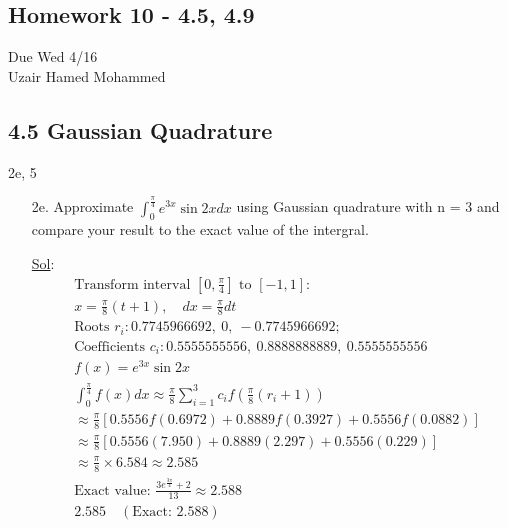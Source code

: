 \begin{center}
  \section*{Homework 10 - 4.5, 4.9}
  Due Wed 4/16 \\
  Uzair Hamed Mohammed
\end{center}

\subsection*{4.5 Gaussian Quadrature}

2e, 5

\begin{enumerate}
  \item[2e.] Approximate \(\int_{0}^{\frac{\pi}{4}} e^{3x} \sin 2x
    dx\) using Gaussian quadrature with n = 3 and compare your result
    to the exact value of the intergral.

    \underline{Sol}:\\

    \[
      \begin{aligned}
        & \text{Transform interval } [0, \tfrac{\pi}{4}] \text{ to } [-1, 1]: \\
        & x = \tfrac{\pi}{8}(t + 1), \quad dx = \tfrac{\pi}{8}dt \\
        & \text{Roots } r_i: 0.7745966692,\ 0,\ -0.7745966692;  \\
        & \text{Coefficients } c_i:
        0.5555555556,\ 0.8888888889,\ 0.5555555556 \\
        & f(x) = e^{3x}\sin 2x \\
        & \int_{0}^{\tfrac{\pi}{4}} f(x)dx \approx \tfrac{\pi}{8}
        \sum_{i=1}^{3} c_i f\left(\tfrac{\pi}{8}(r_i + 1)\right) \\
        & \approx \tfrac{\pi}{8} \left[ 0.5556f(0.6972) +
        0.8889f(0.3927) + 0.5556f(0.0882) \right] \\
        & \approx \tfrac{\pi}{8} \left[ 0.5556(7.950) + 0.8889(2.297)
        + 0.5556(0.229) \right] \\
        & \approx \tfrac{\pi}{8} \times 6.584 \approx 2.585 \\
        & \text{Exact value: } \tfrac{3e^{\tfrac{3\pi}{4}} + 2}{13}
        \approx 2.588 \\
        & \boxed{2.585} \quad (\text{Exact: } \boxed{2.588})
      \end{aligned}
    \]


\end{enumerate}
